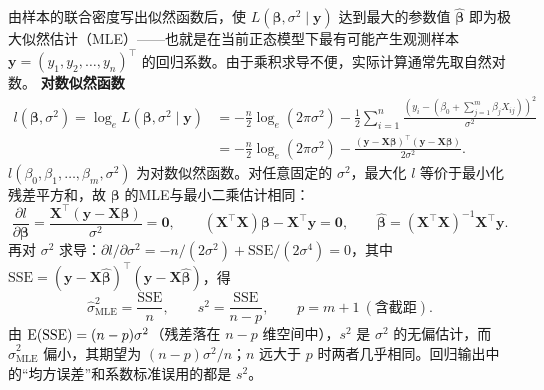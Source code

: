 由样本的联合密度写出似然函数后，使 $L(\bm\beta,\sigma^2\mid\bm y)$ 达到最大的参数值 $\widehat{\bm\beta}$ 即为极大似然估计（MLE）——也就是在当前正态模型下最有可能产生观测样本 $\bm y=(y_1,y_2,\ldots,y_n)^\top$ 的回归系数。由于乘积求导不便，实际计算通常先取自然对数。
\textbf{对数似然函数}
\begin{align*}
l(\bm\beta,\sigma^2)=\log_eL(\bm\beta,\sigma^2\mid\bm y)
&=-\frac n2\log_e(2\pi\sigma^2)
 -\frac12\sum_{i=1}^n\frac{(y_i-(\beta_0+\sum_{j=1}^m\beta_jX_{ij}))^2}{\sigma^2}\\
&=-\frac n2\log_e(2\pi\sigma^2)
 -\frac{(\bm y-\bm X\bm\beta)^\top(\bm y-\bm X\bm\beta)}{2\sigma^2}.
\end{align*}
$l(\beta_0,\beta_1,\ldots,\beta_m,\sigma^2)$ 为对数似然函数。对任意固定的 $\sigma^2$，最大化 $l$ 等价于最小化残差平方和，故 $\bm\beta$ 的MLE与最小二乘估计相同：
\[
\frac{\partial l}{\partial\bm\beta}=\frac{\bm X^\top(\bm y-\bm X\bm\beta)}{\sigma^2}=\bm 0,\qquad
(\bm X^\top\bm X)\bm\beta-\bm X^\top\bm y=\bm 0,\qquad
\widehat{\bm\beta}=(\bm X^\top\bm X)^{-1}\bm X^\top\bm y.
\]
再对 $\sigma^2$ 求导：$\partial l/\partial\sigma^2=-n/(2\sigma^2)+\mathrm{SSE}/(2\sigma^4)=0$，其中 $\mathrm{SSE}=(\bm y-\bm X\widehat{\bm\beta})^\top(\bm y-\bm X\widehat{\bm\beta})$，得
\[
\widehat\sigma^2_{\mathrm{MLE}}=\frac{\mathrm{SSE}}{n},\qquad
s^2=\frac{\mathrm{SSE}}{n-p},\qquad p=m+1\ (\text{含截距}).
\]
由 $\operatorname{E}(\mathrm{SSE})=(n-p)\sigma^2$（残差落在 $n-p$ 维空间中），$s^2$ 是 $\sigma^2$ 的无偏估计，而 $\widehat\sigma^2_{\mathrm{MLE}}$ 偏小，其期望为 $(n-p)\sigma^2/n$；$n$ 远大于 $p$ 时两者几乎相同。回归输出中的“均方误差”和系数标准误用的都是 $s^2$。
